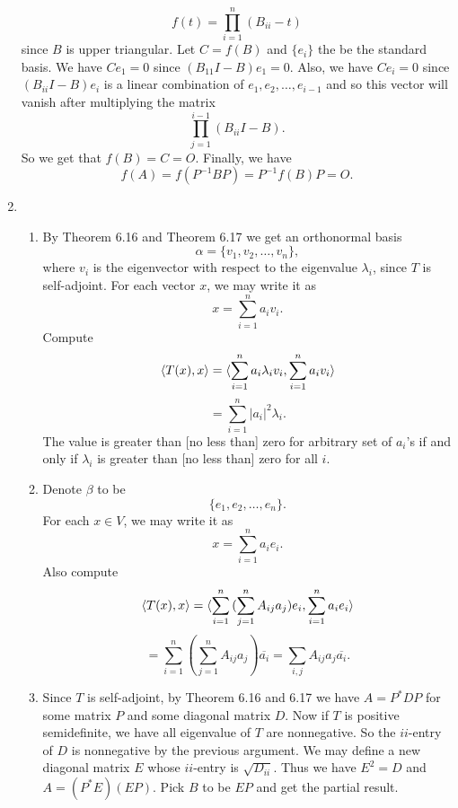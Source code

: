 \begin{enumerate}
\[f(t)=\prod_{i=1}^n{(B_{ii}-t)}\]
since $B$ is upper triangular. Let $C=f(B)$ and $\{e_i\}$ the be the standard basis. We have $Ce_1=0$ since $(B_{11}I-B)e_1=0$. Also, we have $Ce_i=0$ since $(B_{ii}I-B)e_i$ is a linear combination of $e_1,e_2,\ldots ,e_{i-1}$ and so this vector will vanish after multiplying the matrix 
\[\prod_{j=1}^{i-1}{(B_{ii}I-B)}.\]
So we get that $f(B)=C=O$. Finally, we have 
\[f(A)=f(P^{-1}BP)=P^{-1}f(B)P=O.\]
\item \begin{enumerate}
\item By Theorem 6.16 and Theorem 6.17 we get an orthonormal basis 
\[\alpha =\{v_1,v_2,\ldots ,v_n\},\]
where $v_i$ is the eigenvector with respect to the eigenvalue $\lambda_i$, since $T$ is self-adjoint. For each vector $x$, we may write it as 
\[x=\sum_{i=1}^n{a_iv_i}.\]
Compute 
\[\langle T(x),x\rangle =\langle \sum_{i=1}^n{a_i\lambda_i v_i},\sum_{i=1}^n{a_iv_i}\rangle \]
\[=\sum_{i=1}^n{|a_i|^2\lambda_i}.\]
The value is greater than [no less than] zero for arbitrary set of $a_i$'s if and only if $\lambda_i$ is greater than [no less than] zero for all $i$.
\item Denote $\beta $ to be 
\[\{e_1,e_2,\ldots ,e_n\}.\]
For each $x\in V$, we may write it as 
\[x=\sum_{i=1}^n{a_ie_i}.\]
Also compute 
\[\langle T(x),x\rangle =\langle \sum_{i=1}^n{(\sum_{j=1}^n{A_{ij}a_j})e_i},\sum_{i=1}^n{a_ie_i}\rangle \]
\[=\sum_{i=1}^n{(\sum_{j=1}^n{A_{ij}a_j})\overline{a_i}}=\sum_{i,j}{A_{ij}a_j\overline{a_i}}.\]
\item Since $T$ is self-adjoint, by Theorem 6.16 and 6.17 we have $A=P^*DP$ for some matrix $P$ and some diagonal matrix $D$. Now if $T$ is positive semidefinite, we have all eigenvalue of $T$ are nonnegative. So the $ii$-entry of $D$ is nonnegative by the previous argument. We may define a new diagonal matrix $E$ whose $ii$-entry is $\sqrt{D_{ii}}$. Thus we have $E^2=D$ and $A=(P^*E)(EP)$. Pick $B$ to be $EP$ and get the partial result.


\end{enumerate}
\end{enumerate}
